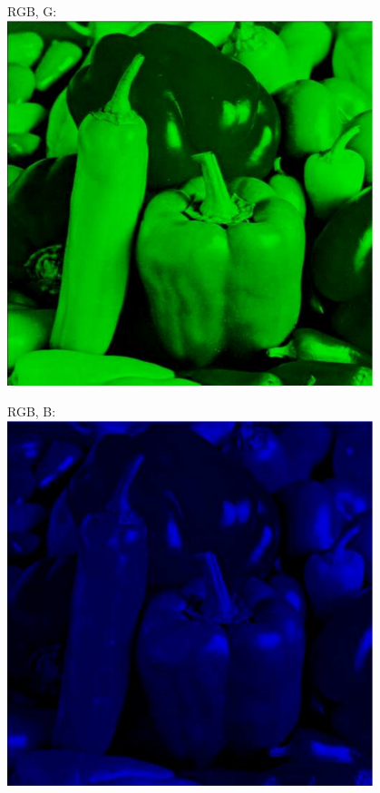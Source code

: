 \documentclass[a4paper,USenglish]{lipics}
\begin{document}
\begin{figure}
\begin{minipage}[b]{0.25\textwidth}
\end{minipage}%
\begin{minipage}[b]{0.25\textwidth}
RGB, G:\\
\includegraphics[width=0.95\textwidth]{images/rgbG}
\end{minipage}%
\begin{minipage}[b]{0.25\textwidth}
RGB, B:\\
\includegraphics[width=0.95\textwidth]{images/rgbB}
\end{minipage}%


\end{figure}
\end{document}

